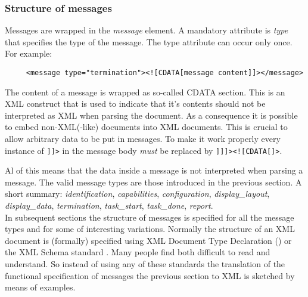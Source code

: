 \documentclass{article}
\begin{document}

   \subsubsection{Structure of messages} \label{ss:structure}

    \noindent Messages are wrapped in the \textit{message} element. A mandatory
    attribute is \textit{type} that specifies the type of the message. The type
    attribute can occur only once. For example:
 
    \begin{verbatim}
     <message type="termination"><![CDATA[message content]]></message>\end{verbatim}

    The content of a message is wrapped as so-called CDATA section. This is an
    XML construct that is used to indicate that it's contents should not be
    interpreted as XML when parsing the document. As a consequence it is
    possible to embed non-XML(-like) documents into XML documents. This is crucial
    to allow arbitrary data to be put in messages. To make it work properly
    every instance of \verb']]>' in the message body \textit{must} be replaced by
    \verb']]]><![CDATA[]>'.
    
    Al of this means that the data inside a message is not interpreted when
    parsing a message.  The valid message types are those introduced in the
    previous section. A short summary: \textit{identification},
    \textit{capabilities}, \textit{configuration}, \textit{display\_layout},
    \textit{display\_data}, \textit{termination}, \textit{task\_start},
    \textit{task\_done}, \textit{report}.
    \\[5pt]
    \noindent In subsequent sections the structure of messages is specified for
    all the message types and for some of interesting variations. Normally the
    structure of an XML document is (formally) specified using XML Document
    Type Declaration (\cite{Sperberg-McQueen:06:EML}) or the XML Schema
    standard \cite{Malhotra:06:XSP}. Many people find both difficult to read
    and understand. So instead of using any of these standards the translation
    of the functional specification of messages the previous section to XML is
    sketched by means of examples.
\end{document}
